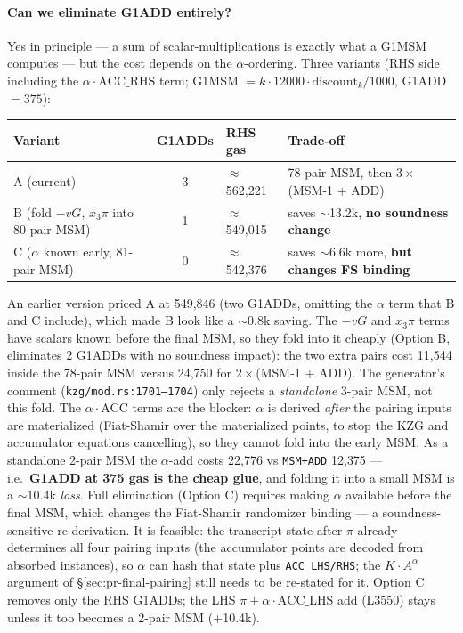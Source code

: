 \paragraph{Can we eliminate G1ADD entirely?}
Yes in principle --- a sum of scalar-multiplications is exactly
what a G1MSM computes --- but the cost depends on the
$\alpha$-ordering. Three variants (RHS side including the
$\alpha\cdot\text{ACC\_RHS}$ term; G1MSM $= k\cdot 12000\cdot
\text{discount}_k/1000$, G1ADD $=375$):
\begin{center}\small
\begin{tabular}{@{}p{4.8cm}cp{2.4cm}p{6.2cm}@{}}
\toprule
\textbf{Variant} & \textbf{G1ADDs} & \textbf{RHS gas} & \textbf{Trade-off} \\
\midrule
A (current) & 3 & $\approx$562{,}221 & 78-pair MSM, then $3\times$(MSM-1 + ADD) \\
B (fold $-vG,\,x_3\pi$ into 80-pair MSM) & 1 & $\approx$549{,}015 & saves $\sim$13.2k, \textbf{no soundness change} \\
C ($\alpha$ known early, 81-pair MSM) & 0 & $\approx$542{,}376 & saves $\sim$6.6k more, \textbf{but changes FS binding} \\
\bottomrule
\end{tabular}
\end{center}
 An earlier version priced A at 549{,}846
(two G1ADDs, omitting the $\alpha$ term that B and C include),
which made B look like a $\sim$0.8k saving.
The $-vG$ and $x_3\pi$ terms have scalars known before the final
MSM, so they fold into it cheaply (Option B, eliminates 2 G1ADDs
with no soundness impact): the two extra pairs cost 11{,}544 inside
the 78-pair MSM versus 24{,}750 for $2\times$(MSM-1 + ADD). The
generator's comment (\texttt{kzg/\allowbreak{}mod.rs:1701--1704}) only rejects
a \emph{standalone} 3-pair MSM, not this fold. The $\alpha\cdot\text{ACC}$ terms are
the blocker: $\alpha$ is derived \emph{after} the pairing inputs
are materialized (Fiat-Shamir over the materialized points, to
stop the KZG and accumulator equations cancelling), so they
cannot fold into the early MSM. As a standalone 2-pair MSM the
$\alpha$-add costs 22{,}776 vs \texttt{MSM+ADD} 12{,}375 ---
i.e.\ \textbf{G1ADD at 375 gas is the cheap glue}, and folding it
into a small MSM is a $\sim$10.4k \emph{loss}. Full elimination
(Option C) requires making $\alpha$ available before the final
MSM, which changes the Fiat-Shamir randomizer binding --- a
soundness-sensitive re-derivation. It is feasible: the transcript
state after $\pi$ already determines all four pairing inputs (the
accumulator points are decoded from absorbed instances), so
$\alpha$ can hash that state plus \texttt{ACC\_LHS/RHS}; the
$K\cdot A^{\alpha}$ argument of \S\ref{sec:pr-final-pairing} still
needs to be re-stated for it. Option C removes only the RHS
G1ADDs; the LHS $\pi+\alpha\cdot\text{ACC\_LHS}$ add (L3550) stays
unless it too becomes a 2-pair MSM (+10.4k).

